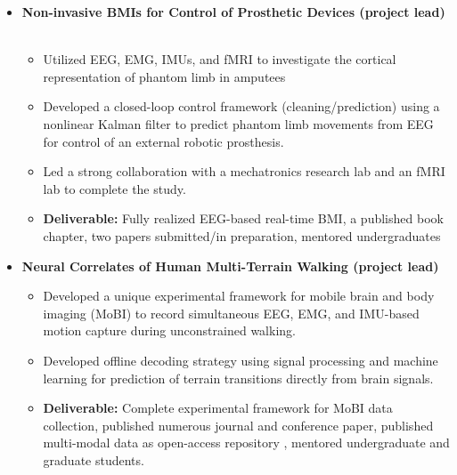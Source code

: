 \begin{adjustwidth}{0.5em}{0pt}
    \begin{itemize}
    \item[\color{accent}\ding{224}] {\color{emphasis}\textbf{Non-invasive BMIs for Control of Prosthetic Devices (project lead) ~~}}\\
    \smallskip
        \begin{itemize}
            \item Utilized EEG, EMG, IMUs, and fMRI to investigate the cortical representation of phantom limb in amputees 
            \item Developed a closed-loop control framework (cleaning/prediction) using a nonlinear Kalman filter to predict phantom limb movements from EEG for control of an external robotic prosthesis. 
            \item Led a strong collaboration with a mechatronics research lab and an fMRI lab to complete the study. 
            \item {\color{pink} \textbf{Deliverable:}} Fully realized EEG-based real-time BMI, a published book chapter, two papers submitted/in preparation, mentored undergraduates
        \end{itemize}
    \medskip    
    
    \item[\color{accent}\ding{224}] {\color{emphasis}\textbf{Neural Correlates of Human Multi-Terrain Walking (project lead) \hspace{10pt} }}\\
    \smallskip
        \begin{itemize}
            \item Developed a unique experimental framework for mobile brain and body imaging (MoBI) to record simultaneous EEG, EMG, and IMU-based motion capture during unconstrained walking.
            \item Developed offline decoding strategy using signal processing and machine learning for prediction of terrain transitions directly from brain signals.
            \item {\color{pink} \textbf{Deliverable:}} Complete experimental framework for MoBI data collection, published numerous journal and conference paper, published multi-modal data as open-access repository \href{https://figshare.com/articles/EEG_Data/5616109/5}{\faFloppyO}, mentored undergraduate and graduate students.
        \end{itemize}
    \medskip   
    

\end{itemize}
\end{adjustwidth}
